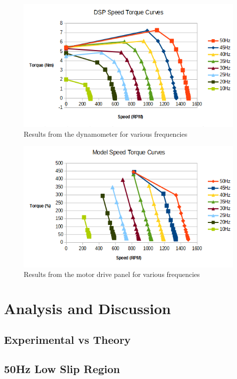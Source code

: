 \documentclass[12pt]{report}
\begin{document}
	\begin{figure}[H]
		\centering
		\includegraphics[scale=0.8]{DSP_pC_1}
		\caption{Results from the dynamometer for various frequencies}
		\label{fig:DSP_results}	
	\end{figure}
	\begin{figure}[H]
		\centering
		\includegraphics[scale=0.8]{Model_pC_1}
		\caption{Results from the motor drive panel for various frequencies}
		\label{fig:Model_results}
	\end{figure}
	
	\chapter{Analysis and Discussion}
	
	\section{Experimental vs Theory}
	
	\section{50Hz Low Slip Region}
	
\end{document}
